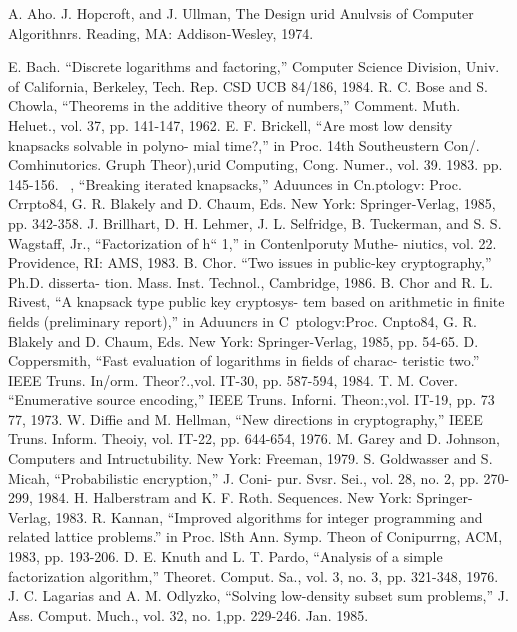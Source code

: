 \documentclass[a4paper,12pt]{article}
\begin{document}
\newpage

\begin{thebibliography}{9}
A. Aho. J. Hopcroft, and J. Ullman, The Design urid Anulvsis of Computer Algorithnrs. Reading, MA: Addison-Wesley, 1974.

E. Bach. “Discrete logarithms and factoring,” Computer Science Division, Univ. of California, Berkeley, Tech. Rep. CSD UCB 84/186, 1984.
R. C. Bose and S. Chowla, “Theorems in the additive theory of numbers,” Comment. Muth. Heluet., vol. 37, pp. 141-147, 1962.
E. F. Brickell, “Are most low density knapsacks solvable in polyno- mial time?,” in Proc. 14th Southeustern Con/. Comhinutorics. Gruph Theor),urid Computing, Cong. Numer., vol. 39. 1983. pp. 145-156.
~, “Breaking iterated knapsacks,” Aduunces in Cn.ptologv: Proc. Crrpto84, G. R. Blakely and D. Chaum, Eds. New York: Springer-Verlag, 1985, pp. 342-358.
J. Brillhart, D. H. Lehmer, J. L. Selfridge, B. Tuckerman, and S. S. Wagstaff, Jr., “Factorization of h“ 1,” in Contenlporuty Muthe- niutics, vol. 22. Providence, RI: AMS, 1983.
B. Chor. “Two issues in public-key cryptography,” Ph.D. disserta- tion. Mass. Inst. Technol., Cambridge, 1986.
\bibitem
B. Chor and R. L. Rivest, “A knapsack type public key cryptosys- tem based on arithmetic in finite fields (preliminary report),” in Aduuncrs in C~ptologv:Proc. Cnpto84, G. R. Blakely and D. Chaum, Eds. New York: Springer-Verlag, 1985, pp. 54-65.
D. Coppersmith, “Fast evaluation of logarithms in fields of charac- teristic two.” IEEE Truns. In/orm. Theor?.,vol. IT-30, pp. 587-594, 1984.
T. M. Cover. “Enumerative source encoding,” IEEE Truns. Inforni. Theon:,vol. IT-19, pp. 73 77, 1973.
W. Diffie and M. Hellman, “New directions in cryptography,” IEEE Truns. Inform. Theoiy, vol. IT-22, pp. 644-654, 1976.
M. Garey and D. Johnson, Computers and Intructubility. New York: Freeman, 1979.
S. Goldwasser and S. Micah, “Probabilistic encryption,” J. Coni- pur. Svsr. Sei., vol. 28, no. 2, pp. 270-299, 1984.
H. Halberstram and K. F. Roth. Sequences. New York: Springer-Verlag, 1983.
R. Kannan, “Improved algorithms for integer programming and related lattice problems.” in Proc. lSth Ann. Symp. Theon of Conipurrng, ACM, 1983, pp. 193-206.
D. E. Knuth and L. T. Pardo, “Analysis of a simple factorization algorithm,” Theoret. Comput. Sa., vol. 3, no. 3, pp. 321-348, 1976.
J. C. Lagarias and A. M. Odlyzko, “Solving low-density subset sum problems,” J. Ass. Comput. Much., vol. 32, no. 1,pp. 229-246. Jan. 1985.

\end{thebibliography}
\end{document}
